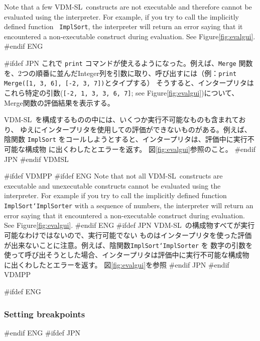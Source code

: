\documentclass[\pformat,12pt]{article}
\newcommand{\vdmslpp}{VDM-SL}
\newcommand{\vdmslpp}{VDM++}
\newcommand{\aaa}{\tt }
\begin{document}
Note that a few \vdmslpp\ constructs are not executable and therefore
cannot be evaluated using the interpreter. For example, if you try
to call the implicitly defined function   {\aaa
  ImplSort}, the interpreter will return an error saying that it
encountered a non-executable construct during evaluation.  See Figure\ref{fig:evalgui}. 
#endif ENG

#ifdef JPN
これで {\tt print} コマンドが使えるようになった。例えば、{\aaa Merge} 関数
を、2つの順番に並んだInteger列を引数に取り、呼び出すには（例：{\tt print Merge([1, 3, 6], [-2, 3, 7])}とタイプする）
そうすると、インタープリタはこれら特定の引数({\tt [-2, 1, 3, 3, 6, 7]};
see Figure\ref{fig:evalgui})について、Merge関数の評価結果を表示する。 

 \vdmslpp\ を構成するものの中には、いくつか実行不可能なものも含まれており、
 ゆえにインタープリタを使用しての評価ができないものがある。例えば、陰関数
  {\aaa ImplSort}
 をコールしようとすると、インタープリタは、評価中に実行不可能な構成物
 に出くわしたとエラーを返す。
 図\ref{fig:evalgui}参照のこと。
#endif JPN
#endif VDMSL

#ifdef VDMPP
#ifdef ENG
Note that not all \vdmslpp\ constructs are executable and unexecutable
constructs cannot be evaluated using the interpreter.  For example if
you try to call the implicitly defined function {\aaa
  ImplSort`ImplSorter} with a sequence of numbers, the interpreter
will return an error saying that it encountered a non-executable construct
 during evaluation. See
Figure\ref{fig:evalgui}.
#endif ENG
#ifdef JPN
\vdmslpp\ の構成物すべてが実行可能なわけではないので、実行可能でない
ものはインタープリタを使った評価が出来ないことに注意。例えば、陰関数{\aaa ImplSort`ImplSorter} を
数字の引数を使って呼び出そうとした場合、インタープリタは評価中に実行不可能な構成物
に出くわしたとエラーを返す。
図\ref{fig:evalgui}を参照
#endif JPN
#endif VDMPP

#ifdef ENG
\subsubsection{Setting breakpoints}
\label{sec:gui-breakpoints} 
#endif ENG
#ifdef JPN
\end{document}
